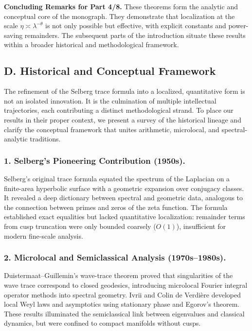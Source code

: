 \medskip

\noindent\textbf{Concluding Remarks for Part 4/8.}
These theorems form the analytic and conceptual core of the monograph.
They demonstrate that localization at the scale $\eta\asymp\lambda^{-\theta}$
is not only possible but effective, with explicit constants and power-saving remainders.
The subsequent parts of the introduction situate these results within a broader
historical and methodological framework.


\subsection*{D. Historical and Conceptual Framework}

The refinement of the Selberg trace formula into a localized, quantitative form
is not an isolated innovation. It is the culmination of multiple intellectual trajectories,
each contributing a distinct methodological strand. To place our results in their proper context,
we present a survey of the historical lineage and clarify the conceptual framework
that unites arithmetic, microlocal, and spectral-analytic traditions.

\subsubsection*{1. Selberg’s Pioneering Contribution (1950s).}
Selberg’s original trace formula \cite{Selberg1956} equated the spectrum of the Laplacian
on a finite-area hyperbolic surface with a geometric expansion over conjugacy classes.
It revealed a deep dictionary between spectral and geometric data, analogous
to the connection between primes and zeros of the zeta function.
The formula established exact equalities but lacked quantitative localization:
remainder terms from cusp truncation were only bounded coarsely ($O(1)$),
insufficient for modern fine-scale analysis.

\subsubsection*{2. Microlocal and Semiclassical Analysis (1970s–1980s).}
Duistermaat–Guillemin’s wave-trace theorem \cite{DG1975}
proved that singularities of the wave trace correspond to closed geodesics,
introducing microlocal Fourier integral operator methods into spectral geometry.
Ivrii \cite{Ivrii1980} and Colin de Verdière \cite{Colin1978} developed local Weyl laws
and asymptotics using stationary phase and Egorov’s theorem.
These results illuminated the semiclassical link between eigenvalues and classical dynamics,
but were confined to compact manifolds without cusps.

